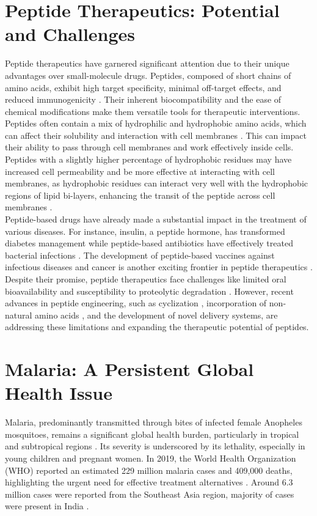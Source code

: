 \section{Peptide Therapeutics: Potential and Challenges} 
Peptide therapeutics have garnered significant attention due to their unique advantages over
small-molecule drugs. Peptides, composed of short chains of amino acids, exhibit high target
specificity, minimal off-target effects, and reduced immunogenicity \cite{wang2022therapeutic}.
Their inherent biocompatibility and the ease of chemical modifications make them versatile tools for
therapeutic interventions. Peptides often contain a mix of hydrophilic and hydrophobic amino acids,
which can affect their solubility and interaction with cell membranes \cite{madani2011mech}. This
can impact their ability to pass through cell membranes and work effectively inside cells. Peptides
with a slightly higher percentage of hydrophobic residues may have increased cell permeability
\cite{madani2011mech} and be more effective at interacting with cell membranes, as hydrophobic
residues can interact very well with the hydrophobic regions of lipid bi-layers, enhancing the
transit of the peptide across cell membranes \cite{madani2011mech}. \\

Peptide-based drugs have already made a substantial impact in the treatment of various diseases. For
instance, insulin, a peptide hormone, has transformed diabetes management while peptide-based
antibiotics have effectively treated bacterial infections \cite{cesar2023adv}. The development of
peptide-based vaccines against infectious diseases and cancer is another exciting frontier in
peptide therapeutics \cite{purcell2007vaccine}. \\

Despite their promise, peptide therapeutics face challenges like limited oral bioavailability and
susceptibility to proteolytic degradation \cite{muttenthaler2021trends}. However, recent advances in
peptide engineering, such as cyclization \cite{hayes2021cycl}, incorporation of non-natural amino
acids \cite{li2022nonnat}, and the development of novel delivery systems, are addressing these
limitations and expanding the therapeutic potential of peptides.

\section{Malaria: A Persistent Global Health Issue} 
Malaria, predominantly transmitted through bites of infected female Anopheles mosquitoes, remains a
significant global health burden, particularly in tropical and subtropical regions
\cite{duguma2022ethiopia, ghosh2021malaria}. Its severity is underscored by its lethality,
especially in young children and pregnant women. In 2019, the World Health Organization (WHO)
reported an estimated 229 million malaria cases and 409,000 deaths, highlighting the urgent need for
effective treatment alternatives \cite{jain2022pregnancy}. Around 6.3 million cases were reported
from the Southeast Asia region, majority of cases were present in India
\cite{cristina2020pregnancy}. \\

